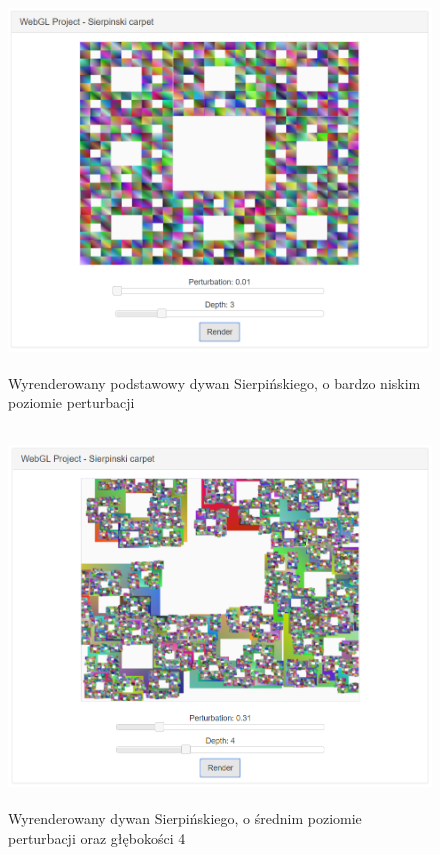 \documentclass[a4paper,11pt]{article}
\begin{document}
\begin{figure}[H]
\centering
 \includegraphics[height=10cm]{pert1.PNG}
\caption{Wyrenderowany podstawowy dywan Sierpińskiego, o bardzo niskim poziomie perturbacji}
\end{figure}



\begin{figure}[H]
\centering
 \includegraphics[height=10cm]{pert2.PNG}
\caption{Wyrenderowany dywan Sierpińskiego, o średnim poziomie perturbacji oraz głębokości 4}
\end{figure}
\end{document}
